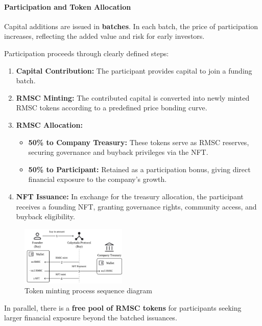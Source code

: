 \documentclass[conference]{IEEEtran}
\begin{document}
\paragraph{Participation and Token Allocation}
Capital additions are issued in \textbf{batches}. In each batch, the price of participation increases, reflecting the added value and risk for early investors.

Participation proceeds through clearly defined steps:

\begin{enumerate}
    \item \textbf{Capital Contribution:} The participant provides capital to join a funding batch.
    \item \textbf{RMSC Minting:} The contributed capital is converted into newly minted RMSC tokens according to a predefined price bonding curve.
    \item \textbf{RMSC Allocation:}
    \begin{itemize}
        \item \textbf{50\% to Company Treasury:} These tokens serve as RMSC reserves, securing governance and buyback privileges via the NFT.
        \item \textbf{50\% to Participant:} Retained as a participation bonus, giving direct financial exposure to the company's growth.
    \end{itemize}
    \item \textbf{NFT Issuance:} In exchange for the treasury allocation, the participant receives a founding NFT, granting governance rights, community access, and buyback eligibility.
\end{enumerate}

\begin{figure}[ht]
\centering
\includegraphics[width=0.45\textwidth]{minting-diagram.pdf}
\caption{Token minting process sequence diagram}
\label{fig:minting-strategy}
\end{figure}

In parallel, there is a \textbf{free pool of RMSC tokens} for participants seeking larger financial exposure beyond the batched issuances.
\end{document}
